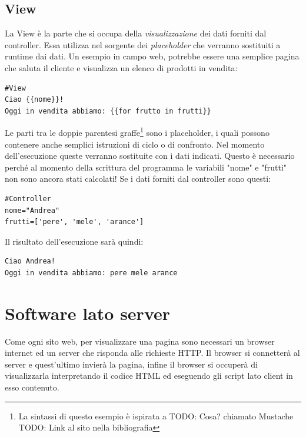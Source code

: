 \subsection{View}\label{sec:view}
La View è la parte che si occupa della \emph{visualizzazione} dei dati forniti dal controller. Essa utilizza nel sorgente dei \emph{placeholder} che verranno sostituiti a runtime dai dati.
Un esempio in campo web, potrebbe essere una semplice pagina che saluta il cliente e visualizza un elenco di prodotti in vendita:
\begin{lstlisting}
#View
Ciao {{nome}}!
Oggi in vendita abbiamo: {{for frutto in frutti}}
\end{lstlisting}
Le parti tra le doppie parentesi graffe\footnote{La sintassi di questo esempio è ispirata a TODO: Cosa? chiamato Mustache TODO: Link al sito nella bibliografia} sono i placeholder, i quali possono contenere anche semplici istruzioni di ciclo o di confronto. Nel momento dell'esecuzione queste verranno sostituite con i dati indicati. Questo è necessario perché al momento della scrittura del programma le variabili "nome" e "frutti" non sono ancora stati calcolati!
Se i dati forniti dal controller sono questi:
\begin{lstlisting}
#Controller
nome="Andrea"
frutti=['pere', 'mele', 'arance']
\end{lstlisting}
Il risultato dell'esecuzione sarà quindi:
\begin{lstlisting}
Ciao Andrea!
Oggi in vendita abbiamo: pere mele arance
\end{lstlisting}

\section{Software lato server}
Come ogni sito web, per visualizzare una pagina sono necessari un browser internet ed un server che risponda alle richieste HTTP. Il browser si connetterà al server e quest'ultimo invierà la pagina, infine il browser si occuperà di visualizzarla interpretando il codice HTML ed eseguendo gli script lato client in esso contenuto.
